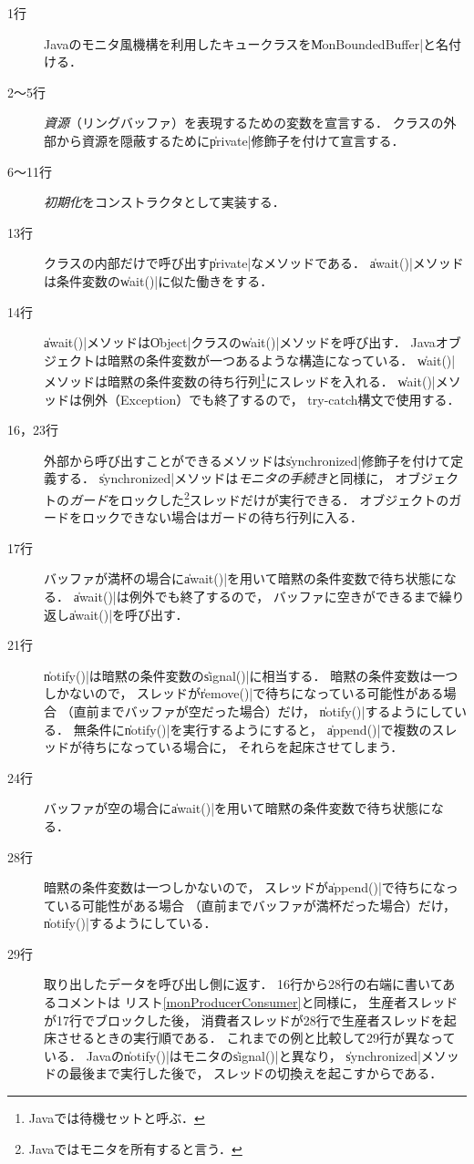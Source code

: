\begin{description}
\item [1行]
  Javaのモニタ風機構を利用したキュークラスを\|MonBoundedBuffer|と名付ける．
\item [2〜5行]
  \emph{資源}（リングバッファ）を表現するための変数を宣言する．
  クラスの外部から資源を隠蔽するために\|private|修飾子を付けて宣言する．
\item [6〜11行]
  \emph{初期化}をコンストラクタとして実装する．
\item [13行]
  クラスの内部だけで呼び出す\|private|なメソッドである．
  \|await()|メソッドは条件変数の\|wait()|に似た働きをする．
\item [14行]
  \|await()|メソッドは\|Object|クラスの\|wait()|メソッドを呼び出す．
  Javaオブジェクトは暗黙の条件変数が一つあるような構造になっている．
  \|wait()|メソッドは暗黙の条件変数の待ち行列\footnote{
    Javaでは待機セットと呼ぶ．}にスレッドを入れる．
  \|wait()|メソッドは例外（Exception）でも終了するので，
  try-catch構文で使用する．
\item [16，23行]
  外部から呼び出すことができるメソッドは\|synchronized|修飾子を付けて定義する．
  \|synchronized|メソッドは\emph{モニタの手続き}と同様に，
  オブジェクトの\emph{ガード}をロックした\footnote{
    Javaではモニタを所有すると言う．}スレッドだけが実行できる．
  オブジェクトのガードをロックできない場合はガードの待ち行列に入る．
\item [17行]
  バッファが満杯の場合に\|await()|を用いて暗黙の条件変数で待ち状態になる．
  \|await()|は例外でも終了するので，
  バッファに空きができるまで繰り返し\|await()|を呼び出す．
\item [21行]
  \|notify()|は暗黙の条件変数の\|signal()|に相当する．
  暗黙の条件変数は一つしかないので，
  スレッドが\|remove()|で待ちになっている可能性がある場合
  （直前までバッファが空だった場合）だけ，
  \|notify()|するようにしている．
  無条件に\|notify()|を実行するようにすると，
  \|append()|で複数のスレッドが待ちになっている場合に，
  それらを起床させてしまう．
\item [24行]
  バッファが空の場合に\|await()|を用いて暗黙の条件変数で待ち状態になる．
\item [28行]
  暗黙の条件変数は一つしかないので，
  スレッドが\|append()|で待ちになっている可能性がある場合
  （直前までバッファが満杯だった場合）だけ，
  \|notify()|するようにしている．
\item [29行]
  取り出したデータを呼び出し側に返す．
  16行から28行の右端に書いてあるコメントは
  リスト\ref{monProducerConsumer}と同様に，
  生産者スレッドが17行でブロックした後，
  消費者スレッドが28行で生産者スレッドを起床させるときの実行順である．
  これまでの例と比較して29行が異なっている．
  Javaの\|notify()|はモニタの\|signal()|と異なり，
  \|synchronized|メソッドの最後まで実行した後で，
  スレッドの切換えを起こすからである．
\end{description}


